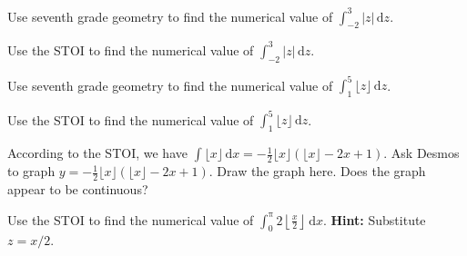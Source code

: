 \documentclass[12pt,fleqn]{exam}
\begin{document}
\begin{questions}

\question [1] Use  seventh grade geometry to find the numerical value of $\int_{-2}^3  |z| \, \mathrm{d} z$.
\begin{solution}[2.5in]

\end{solution}

\question [1] Use  the STOI to find the numerical value of $\int_{-2}^3  |z| \, \mathrm{d} z$.
\begin{solution}%

\end{solution}

\newpage

\question [1] Use seventh grade geometry to find the numerical value of $\int_1^5  \lfloor z \rfloor \, \mathrm{d} z$.
\begin{solution}[3.5in]

\end{solution}

\question [1] Use the STOI to find the numerical value of $\int_1^5  \lfloor z \rfloor \, \mathrm{d} z$.
\begin{solution}%

\end{solution}

\newpage

 \question [1] According to the STOI, we have $\int \lfloor x \rfloor \, \mathrm{d} x = - \frac{1}{2} 
 \lfloor x \rfloor \left(\lfloor x \rfloor - 2 x + 1\right)$. Ask Desmos to graph
 $y = - \frac{1}{2}  \lfloor x \rfloor \left(\lfloor x \rfloor - 2 x + 1\right)$.  Draw the graph here. 
Does the graph appear to be continuous?


\begin{solution}[3.5in]

\end{solution}

\question [1] Use the STOI to find the numerical value of $\int_0^\uppi 2 \left \lfloor \frac{x}{2} \right \rfloor \, \mathrm{d} x$.
\textbf{Hint:} Substitute $z = x/2$.
\end{questions}
\end{document}
